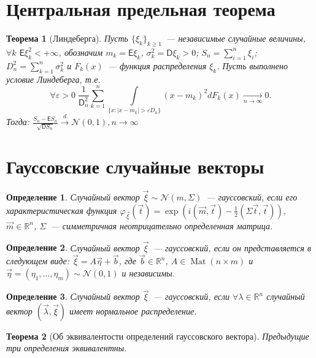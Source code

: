 \documentclass[11pt]{article}
\newtheorem{thm}{Теорема}[section]
\newtheorem{definition}{Определение}
\newcommand{\E}{\mathsf{E}}
\newcommand{\D}{\mathsf{D}}
\newcommand{\N}{\mathcal{N}}
\newcommand{\R}{\mathbb{R}}
\DeclareMathOperator{\Mat}{Mat}
\begin{document}
	\section{Центральная предельная теорема}
	\begin{thm}[Линдеберга]
		Пусть $\{\xi_k\}_{k \geq 1}$~--- независимые случайные величины,
		$\forall k$ $\E\xi_k^2 < +\infty$, обозначим $m_k = \E\xi_k$, $\sigma_k^2 = \D\xi_k > 0$; 
		$S_n = \sum\limits_{i=1}^n \xi_i$; $D_n^2 = \sum\limits_{k=1}^n \sigma_k^2$ и $F_k(x)$~--- 					функция распределения $\xi_k$. Пусть выполнено условие Линдеберга, т.е.
		\[
			\forall\varepsilon > 0\;\frac{1}{\D_n^2}\sum\limits_{k=1}^n\int\limits_{\{x : |x - m_k| > 					\varepsilon D_n\}}(x - m_k)^2 dF_k(x)\underset{n\rightarrow\infty}{\longrightarrow}0.			
		\]  
		Тогда: $\frac{S_n - \E S_n}{\sqrt{\D S_n}}\overset{d}{\rightarrow}\N(0,1), n\rightarrow \infty$	
	\end{thm}
	\section{Гауссовские случайные векторы}
	\begin{definition}
		Случайный вектор $\vec\xi\sim\N(m, \Sigma)$~--- гауссовский, если его характеристическая функция 
		$\varphi_{\vec\xi}(\vec t) = \exp \left(i(\vec m, \vec t) - \frac{1}{2}(\Sigma\vec t, \vec t)
		\right)$, $\vec m \in \R^n$, $\Sigma$~--- симметричная неотрицательно определенная матрица.
	\end{definition}	
	\begin{definition}
		Случайный вектор $\vec\xi$~--- гауссовский, если он представляется в следующем виде: 
		$\vec\xi = A\vec\eta + \vec b$, где $\vec b \in \R^n$, $A \in \Mat (n\times m)$ и $\vec\eta = 
		(\eta_1, \dots, \eta_m)\sim\N(0,1)$ и независимы.
	\end{definition}
	\begin{definition}
		Случайный вектор $\vec\xi$~--- гауссовский, если $\forall\lambda\in\R^n$ случайный вектор
		$(\vec\lambda,\vec\xi)$ имеет нормальное распределение.
	\end{definition}
	\begin{thm}[Об эквивалентости определений гауссовского вектора]
		Предыдущие три определения эквивалентны.
	\end{thm}
\end{document}
